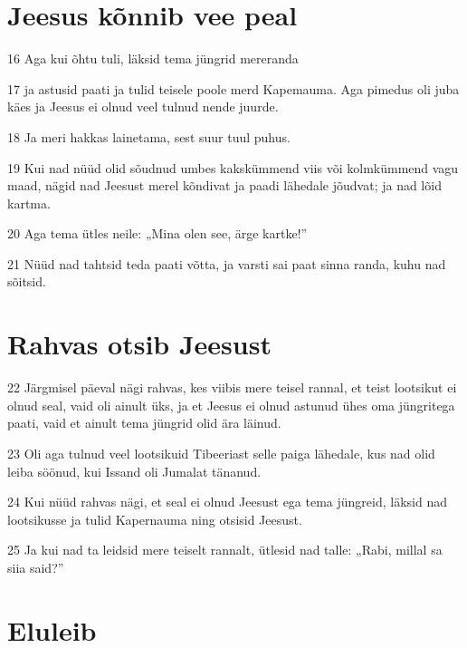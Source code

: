 \section*{Jeesus kõnnib vee peal}

\par 16 Aga kui õhtu tuli, läksid tema jüngrid mereranda
\par 17 ja astusid paati ja tulid teisele poole merd Kapemauma. Aga pimedus oli juba käes ja Jeesus ei olnud veel tulnud nende juurde.
\par 18 Ja meri hakkas lainetama, sest suur tuul puhus.
\par 19 Kui nad nüüd olid sõudnud umbes kakskümmend viis või kolmkümmend vagu maad, nägid nad Jeesust merel kõndivat ja paadi lähedale jõudvat; ja nad lõid kartma.
\par 20 Aga tema ütles neile: „Mina olen see, ärge kartke!”
\par 21 Nüüd nad tahtsid teda paati võtta, ja varsti sai paat sinna randa, kuhu nad sõitsid.

\section*{Rahvas otsib Jeesust}

\par 22 Järgmisel päeval nägi rahvas, kes viibis mere teisel rannal, et teist lootsikut ei olnud seal, vaid oli ainult üks, ja et Jeesus ei olnud astunud ühes oma jüngritega paati, vaid et ainult tema jüngrid olid ära läinud.
\par 23 Oli aga tulnud veel lootsikuid Tibeeriast selle paiga lähedale, kus nad olid leiba söönud, kui Issand oli Jumalat tänanud.
\par 24 Kui nüüd rahvas nägi, et seal ei olnud Jeesust ega tema jüngreid, läksid nad lootsikusse ja tulid Kapernauma ning otsisid Jeesust.
\par 25 Ja kui nad ta leidsid mere teiselt rannalt, ütlesid nad talle: „Rabi, millal sa siia said?”

\section*{Eluleib}

